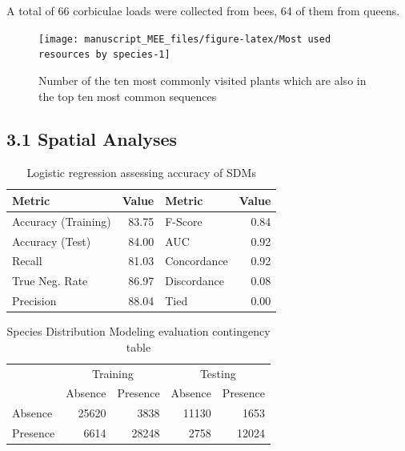 \documentclass[
]{article}
\begin{document}
A total of 66 corbiculae loads were collected from bees, 64 of them from
queens.

\begin{figure}
\texttt{[image: manuscript\_MEE\_files/figure-latex/Most used resources by species-1]} \caption{Number of the ten most commonly visited plants which are also in the top ten most common sequences}\label{fig:Most used resources by species}
\end{figure}

\hypertarget{spatial-analyses-1}{%
\subsection{3.1 \textbar{} Spatial Analyses}\label{spatial-analyses-1}}

\begin{table}

\caption{\label{tab:Results for SA Logistic Regression Metrics}Logistic regression assessing accuracy of SDMs}
\centering
\begin{tabular}[t]{lrlr}
\toprule
Metric & Value & Metric & Value\\
\midrule
Accuracy (Training) & 83.75 & F-Score & 0.84\\
Accuracy (Test) & 84.00 & AUC & 0.92\\
Recall & 81.03 & Concordance & 0.92\\
True Neg. Rate & 86.97 & Discordance & 0.08\\
Precision & 88.04 & Tied & 0.00\\
\bottomrule
\end{tabular}
\end{table}

\begin{table}

\caption{\label{tab:Results for SA Logistic Regression Contingency table}Species Distribution Modeling evaluation contingency table}
\centering
\begin{tabular}[t]{lrrrr}
\toprule
\multicolumn{1}{c}{ } & \multicolumn{2}{c}{Training} & \multicolumn{2}{c}{Testing} \\
\cmidrule(l{3pt}r{3pt}){2-3} \cmidrule(l{3pt}r{3pt}){4-5}
 &  Absence  &   Presence   &  Absence  &  Presence \\
\midrule
Absence & 25620 & 3838 & 11130 & 1653\\
Presence & 6614 & 28248 & 2758 & 12024\\
\bottomrule
\end{tabular}
\end{table}
\end{document}
